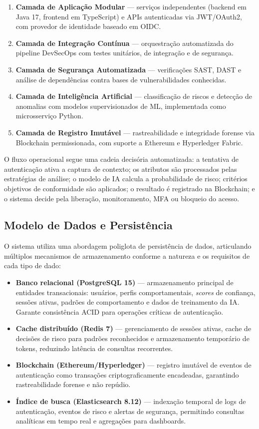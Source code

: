 \documentclass[12pt]{article}
\begin{document}
\begin{enumerate}[leftmargin=*]
    \item \textbf{Camada de Aplicação Modular} --- serviços independentes (backend em Java 17, frontend em TypeScript) e APIs autenticadas via JWT/OAuth2, com provedor de identidade baseado em OIDC.
    \item \textbf{Camada de Integração Contínua} --- orquestração automatizada do pipeline DevSecOps com testes unitários, de integração e de segurança.
    \item \textbf{Camada de Segurança Automatizada} --- verificações SAST, DAST e análise de dependências contra bases de vulnerabilidades conhecidas.
    \item \textbf{Camada de Inteligência Artificial} --- classificação de riscos e detecção de anomalias com modelos supervisionados de ML, implementada como microsserviço Python.
    \item \textbf{Camada de Registro Imutável} --- rastreabilidade e integridade forense via Blockchain permissionada, com suporte a Ethereum e Hyperledger Fabric.
\end{enumerate}

O fluxo operacional segue uma cadeia decisória automatizada: a tentativa de autenticação ativa a captura de contexto; os atributos são processados pelas estratégias de análise; o modelo de IA calcula a probabilidade de risco; critérios objetivos de conformidade são aplicados; o resultado é registrado na Blockchain; e o sistema decide pela liberação, monitoramento, MFA ou bloqueio do acesso.

\subsection{Modelo de Dados e Persistência}

O sistema utiliza uma abordagem poliglota de persistência de dados, articulando múltiplos mecanismos de armazenamento conforme a natureza e os requisitos de cada tipo de dado:

\begin{itemize}[leftmargin=*]
    \item \textbf{Banco relacional (PostgreSQL 15)} --- armazenamento principal de entidades transacionais: usuários, perfis comportamentais, \textit{scores} de confiança, sessões ativas, padrões de comportamento e dados de treinamento da IA. Garante consistência ACID para operações críticas de autenticação.
    \item \textbf{Cache distribuído (Redis 7)} --- gerenciamento de sessões ativas, cache de decisões de risco para padrões reconhecidos e armazenamento temporário de tokens, reduzindo latência de consultas recorrentes.
    \item \textbf{Blockchain (Ethereum/Hyperledger)} --- registro imutável de eventos de autenticação como transações criptograficamente encadeadas, garantindo rastreabilidade forense e não repúdio.
    \item \textbf{Índice de busca (Elasticsearch 8.12)} --- indexação temporal de logs de autenticação, eventos de risco e alertas de segurança, permitindo consultas analíticas em tempo real e agregações para dashboards.
\end{itemize}
\end{document}
